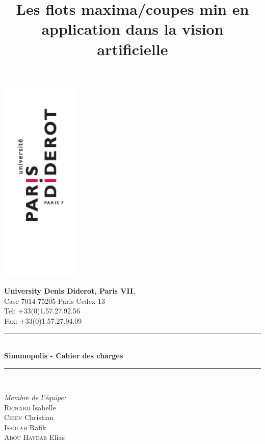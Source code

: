 \title{Les flots maxima/coupes min en application dans la vision artificielle}

\afterpage{}
\begin{titlepage}

\newcommand{\HRule}{\rule{\linewidth}{0.5mm}} %

    \begin{minipage}[t]{\textwidth}
        \begin{minipage}[t]{.55 \textwidth}
        \includegraphics[width=3.8cm]{logo-P7.png}
        \end{minipage}%
        \begin{minipage}[b]{.50 \textwidth}
	    \textbf{University Denis Diderot, Paris VII}, \\
	      {\scriptsize %
	      Case 7014
	      75205 Paris Cedex 13 \\Tel: +33(0)1.57.27.92.56 \\Fax: +33(0)1.57.27.94.09 \\
            }
        \end{minipage}

    \end{minipage}

\center

\HRule \\[0.5cm]
{ \huge \bfseries Simunopolis - Cahier des charges}\\[0.4cm] %
\HRule \\[1.5cm]

\begin{minipage}{0.4\textwidth}
\begin{flushleft} \large
\emph{Membre de l'équipe:}\\
\textsc{Richard} Isabelle\\
\textsc{Chiev} Christian\\
\textsc{Issolah} Rafik\\
\textsc{Abou Haydar} Elias
\end{flushleft}


\end{minipage}
\end{titlepage}
